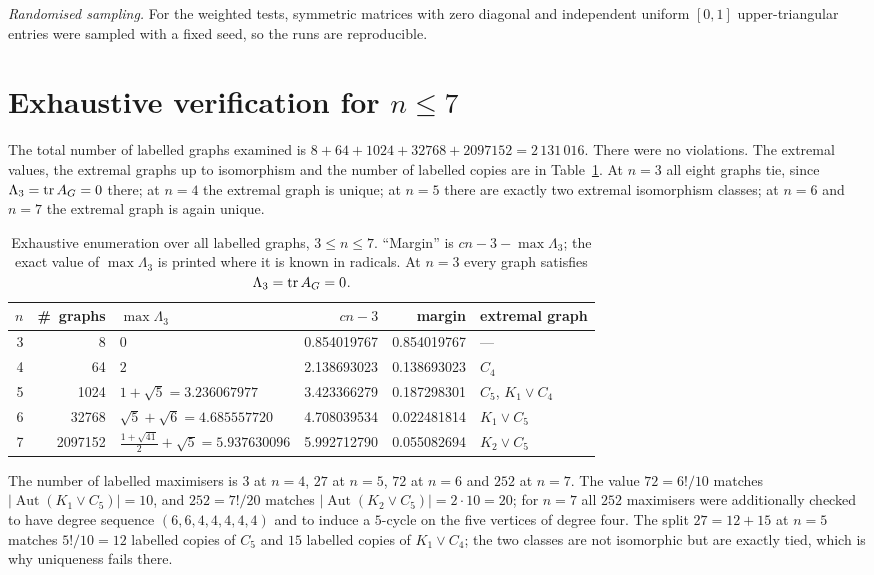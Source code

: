\emph{Randomised sampling.} For the weighted tests, symmetric matrices with
zero diagonal and independent uniform $[0,1]$ upper-triangular entries were
sampled with a fixed seed, so the runs are reproducible.

\section{Exhaustive verification for $n\le7$}\label{sec-exhaustive}
The total number of labelled graphs examined is
$8+64+1024+32768+2097152=2\,131\,016$. There were no violations. The extremal
values, the extremal graphs up to isomorphism and the number of labelled
copies are in Table~\ref{tab-exhaustive}. At $n=3$ all eight graphs tie, since $\Lambda_3=\operatorname{tr} A_G=0$ there;
at $n=4$ the extremal graph is unique; at $n=5$ there are exactly two
extremal isomorphism classes; at $n=6$ and $n=7$ the extremal graph is again
unique.

\begin{table}[htbp]
\centering
\singlespacing
\caption{Exhaustive enumeration over all labelled graphs, $3\le n\le7$.
``Margin'' is $cn-3-\max\Lambda_3$; the exact value of $\max\Lambda_3$ is
printed where it is known in radicals. At $n=3$ every graph satisfies
$\Lambda_3=\operatorname{tr} A_G=0$.}\label{tab-exhaustive}
\footnotesize
\begin{tabular}{@{}r r l r r l@{}}
\toprule
$n$ & \#\ graphs & $\max\Lambda_3$ & $cn-3$ & margin & extremal graph \\
\midrule
3 & 8 & $0$ & 0.854019767 & 0.854019767 & --- \\
4 & 64 & $2$ & 2.138693023 & 0.138693023 & $C_4$ \\
5 & 1024 & $1+\sqrt5=3.236067977$ & 3.423366279 & 0.187298301 & $C_5$, $K_1\vee C_4$ \\
6 & 32768 & $\sqrt5+\sqrt6=4.685557720$ & 4.708039534 & 0.022481814 & $K_1\vee C_5$ \\
7 & 2097152 & $\tfrac{1+\sqrt{41}}2+\sqrt5=5.937630096$ & 5.992712790 & 0.055082694 & $K_2\vee C_5$ \\
\bottomrule
\end{tabular}
\end{table}

The number of labelled maximisers is $3$ at $n=4$, $27$ at $n=5$, $72$ at
$n=6$ and $252$ at $n=7$. The value $72=6!/10$ matches
$|\operatorname{Aut}(K_1\vee C_5)|=10$, and $252=7!/20$ matches
$|\operatorname{Aut}(K_2\vee C_5)|=2\cdot10=20$; for $n=7$ all $252$
maximisers were additionally checked to have degree sequence
$(6,6,4,4,4,4,4)$ and to induce a $5$-cycle on the five vertices of degree
four. The split $27=12+15$ at $n=5$ matches $5!/10=12$ labelled copies of
$C_5$ and $15$ labelled copies of $K_1\vee C_4$; the two classes are not
isomorphic but are exactly tied, which is why uniqueness fails there.


